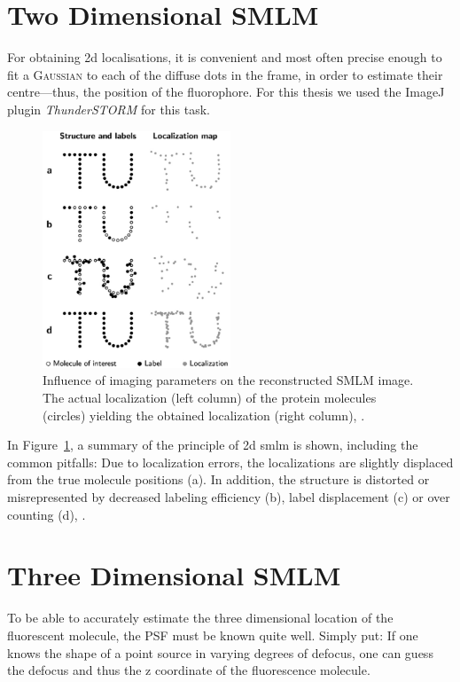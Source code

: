 \documentclass[11pt, a4paper, oneside, twocolumn]{report}
\newcommand{\e}{\emph}
\newcommand{\x}[1]{#1\index{#1}}
\begin{document}
\section{Two Dimensional SMLM}

For obtaining 2d localisations, it is convenient and most often
precise enough to fit a \textsc{\x{Gaussian}} to each of the diffuse dots
in the frame, in order to estimate their centre---thus, the position
of the fluorophore. For this thesis we used the ImageJ plugin
\e{ThunderSTORM} \cite{omk14} for this task.

\begin{figure}[h]
  \centering \includegraphics[width=0.5\textwidth]{2dsmlm.png}
  \caption{Influence of imaging parameters on the reconstructed SMLM
    image. The actual localization (left column) of the protein
    molecules (circles) yielding the obtained localization (right
    column), \cite{smlm}.}
  \label{f:2dsmlm}
\end{figure}

In Figure~\ref{f:2dsmlm}, a summary of the principle of 2d \gls{smlm}
is shown, including the common pitfalls: Due to localization errors,
the localizations are slightly displaced from the true molecule
positions (a). In addition, the structure is distorted or
misrepresented by decreased labeling efficiency (b), label
displacement (c) or over counting (d), \cite{smlm}.


\section{Three Dimensional SMLM}

To be able to accurately estimate the three dimensional location of
the fluorescent molecule, the PSF must be known quite well. Simply
put: If one knows the shape of a point source in varying degrees of
defocus, one can guess the defocus and thus the z coordinate of the
fluorescence molecule.
\end{document}
